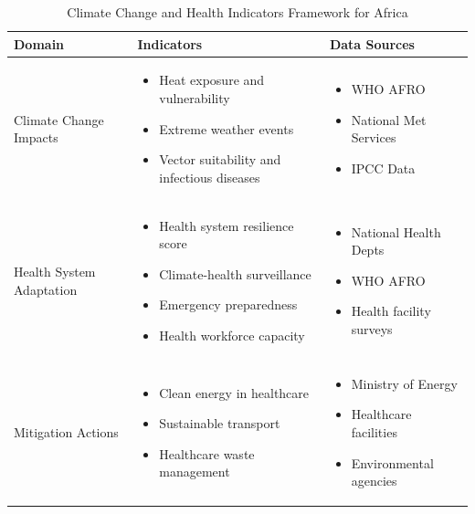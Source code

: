 \begin{table}[t]
\footnotesize
\centering
\caption{Climate Change and Health Indicators Framework for Africa}
\label{tab:indicators}
\begin{tabularx}{\textwidth}{@{}p{4.5cm}X p{4.5cm}@{}}
\toprule
\textbf{Domain} & \textbf{Indicators} & \textbf{Data Sources} \\
\midrule
Climate Change Impacts & 
\begin{itemize}[nosep,leftmargin=*]
\item Heat exposure and vulnerability
\item Extreme weather events
\item Vector suitability and infectious diseases
\end{itemize} & 
\begin{itemize}[nosep,leftmargin=*]
\item WHO AFRO
\item National Met Services
\item IPCC Data
\end{itemize} \\
\midrule
Health System Adaptation & 
\begin{itemize}[nosep,leftmargin=*]
\item Health system resilience score
\item Climate-health surveillance
\item Emergency preparedness
\item Health workforce capacity
\end{itemize} & 
\begin{itemize}[nosep,leftmargin=*]
\item National Health Depts
\item WHO AFRO
\item Health facility surveys
\end{itemize} \\
\midrule
Mitigation Actions & 
\begin{itemize}[nosep,leftmargin=*]
\item Clean energy in healthcare
\item Sustainable transport
\item Healthcare waste management
\end{itemize} & 
\begin{itemize}[nosep,leftmargin=*]
\item Ministry of Energy
\item Healthcare facilities
\item Environmental agencies

\end{itemize}
\end{tabularx}
\end{table}
